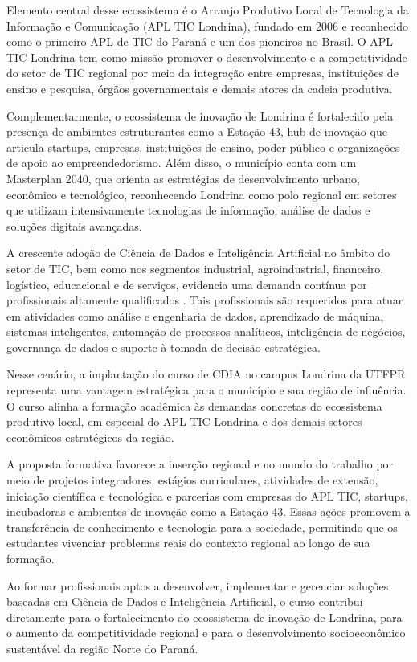 Elemento central desse ecossistema é o Arranjo Produtivo Local de Tecnologia da Informação e Comunicação (APL TIC Londrina), fundado em 2006 e reconhecido como o primeiro APL de TIC do Paraná e um dos pioneiros no Brasil. O APL TIC Londrina tem como missão promover o desenvolvimento e a competitividade do setor de TIC regional por meio da integração entre empresas, instituições de ensino e pesquisa, órgãos governamentais e demais atores da cadeia produtiva.

Complementarmente, o ecossistema de inovação de Londrina é fortalecido pela presença de ambientes estruturantes como a Estação 43, hub de inovação que articula startups, empresas, instituições de ensino, poder público e organizações de apoio ao empreendedorismo. Além disso, o município conta com um Masterplan 2040, que orienta as estratégias de desenvolvimento urbano, econômico e tecnológico, reconhecendo Londrina como polo regional em setores que utilizam intensivamente tecnologias de informação, análise de dados e soluções digitais avançadas.

A crescente adoção de Ciência de Dados e Inteligência Artificial no âmbito do setor de TIC, bem como nos segmentos industrial, agroindustrial, financeiro, logístico, educacional e de serviços, evidencia uma demanda contínua por profissionais altamente qualificados \cite{Brasscom_2021}. Tais profissionais são requeridos para atuar em atividades como análise e engenharia de dados, aprendizado de máquina, sistemas inteligentes, automação de processos analíticos, inteligência de negócios, governança de dados e suporte à tomada de decisão estratégica.

Nesse cenário, a implantação do curso de CDIA no campus Londrina da UTFPR representa uma vantagem estratégica para o município e sua região de influência. O curso alinha a formação acadêmica às demandas concretas do ecossistema produtivo local, em especial do APL TIC Londrina e dos demais setores econômicos estratégicos da região.

A proposta formativa favorece a inserção regional e no mundo do trabalho por meio de projetos integradores, estágios curriculares, atividades de extensão, iniciação científica e tecnológica e parcerias com empresas do APL TIC, startups, incubadoras e ambientes de inovação como a Estação 43. Essas ações promovem a transferência de conhecimento e tecnologia para a sociedade, permitindo que os estudantes vivenciar problemas reais do contexto regional ao longo de sua formação.

Ao formar profissionais aptos a desenvolver, implementar e gerenciar soluções baseadas em Ciência de Dados e Inteligência Artificial, o curso contribui diretamente para o fortalecimento do ecossistema de inovação de Londrina, para o aumento da competitividade regional e para o desenvolvimento socioeconômico sustentável da região Norte do Paraná.


